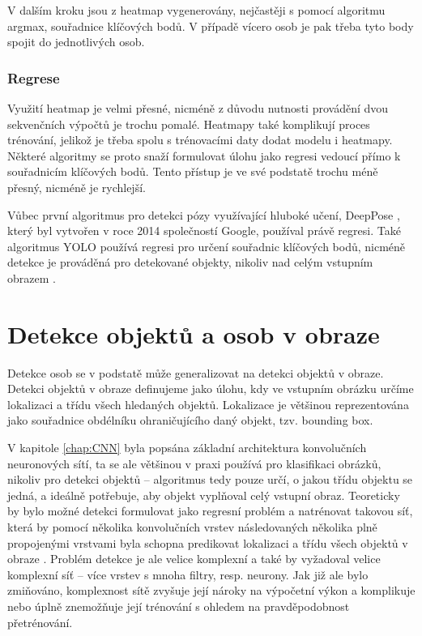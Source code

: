 V dalším kroku jsou z heatmap vygenerovány, nejčastěji s pomocí algoritmu
argmax, souřadnice klíčových bodů. V případě vícero osob je pak třeba tyto body
spojit do jednotlivých osob.

\subsubsection*{Regrese}

Využití heatmap je velmi přesné, nicméně z důvodu nutnosti provádění dvou
sekvenčních výpočtů je trochu pomalé. Heatmapy také komplikují proces
trénování, jelikož je třeba spolu s trénovacími daty dodat modelu i heatmapy.
Některé algoritmy se proto snaží formulovat úlohu jako regresi vedoucí přímo k
souřadnicím klíčových bodů. Tento přístup je ve své podstatě trochu méně
přesný, nicméně je rychlejší.

Vůbec první algoritmus pro detekci pózy využívající hluboké učení, DeepPose
\cite{deeppose}, který byl vytvořen v roce 2014 společností Google, používal
právě regresi. Také algoritmus YOLO používá regresi pro určení souřadnic
klíčových bodů, nicméně detekce je prováděná pro detekované objekty, nikoliv
nad celým vstupním obrazem \cite{yolo-pose}.


\section{Detekce objektů a osob v obraze}
\label{sec:obj_det}

Detekce osob se v podstatě může generalizovat na detekci objektů v obraze.
Detekci objektů v obraze definujeme jako úlohu, kdy ve vstupním obrázku určíme
lokalizaci a třídu všech hledaných objektů. Lokalizace je většinou
reprezentována jako souřadnice obdélníku ohraničujícího daný objekt, tzv.
bounding box.

V kapitole \ref{chap:CNN} byla popsána základní architektura konvolučních
neuronových sítí, ta se ale většinou v praxi používá pro klasifikaci obrázků,
nikoliv pro detekci objektů – algoritmus tedy pouze určí, o jakou třídu objektu
se jedná, a ideálně potřebuje, aby objekt vyplňoval celý vstupní obraz.
Teoreticky by bylo možné detekci formulovat jako regresní problém a natrénovat
takovou síť, která by pomocí několika konvolučních vrstev následovaných
několika plně propojenými vrstvami byla schopna predikovat lokalizaci a třídu
všech objektů v obraze \cite{szegedy}. Problém detekce je ale velice komplexní
a také by vyžadoval velice komplexní síť – více vrstev s mnoha filtry, resp.
neurony. Jak již ale bylo zmiňováno, komplexnost sítě zvyšuje její nároky na
výpočetní výkon a komplikuje nebo úplně znemožňuje její trénování s ohledem na
pravděpodobnost přetrénování.

